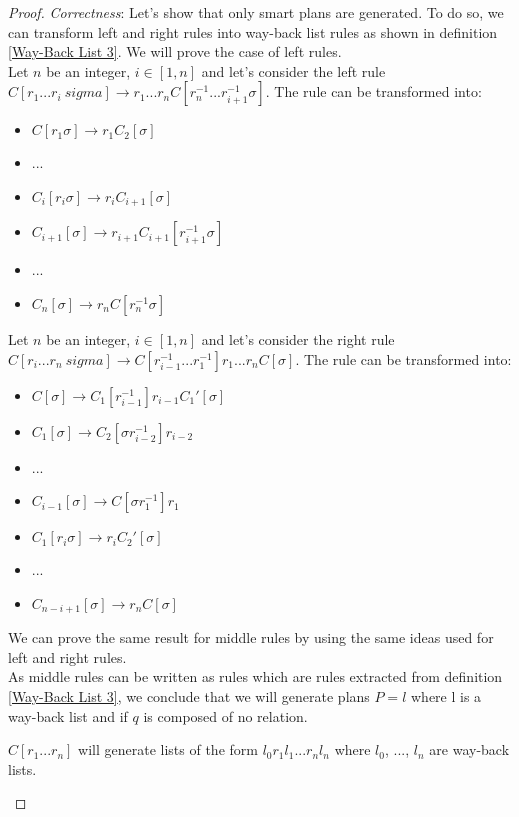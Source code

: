 \documentclass[10pt,a4paper,draft]{article}
\begin{document}
\begin{proof}
\textit{Correctness}: Let's show that only smart plans are generated. To do so, we can transform left and right rules into way-back list rules as shown in definition \ref{Way-Back List 3}. We will prove the case of left rules.\\
Let $n$ be an integer, $i \in [1, n]$ and let's consider the left rule $C[r_1...r_i \ sigma] \rightarrow r_1 ... r_n C[r_n^{-1} ... r_{i+1}^{-1} \sigma]$. The rule can be transformed into:
\begin{itemize}
\item $C[r_1 \sigma] \rightarrow r_1 C_2[\sigma]$
\item ...
\item $C_i[r_i \sigma] \rightarrow r_i C_{i+1}[\sigma]$
\item $C_{i+1}[\sigma] \rightarrow r_{i+1} C_{i+1}[r_{i+1}^{-1} \sigma]$
\item ...
\item $C_n[\sigma] \rightarrow r_n C[r_n^{-1} \sigma]$
\end{itemize}
Let $n$ be an integer, $i \in [1, n]$ and let's consider the right rule $C[r_i...r_n \ sigma] \rightarrow C[r_{i-1}^{-1} ... r_{1}^{-1}] r_1 ... r_n C[\sigma]$. The rule can be transformed into:
\begin{itemize}
\item $C[\sigma] \rightarrow C_1[r_{i-1}^{-1}] r_{i-1} C_1'[\sigma]$
\item $C_1[\sigma] \rightarrow C_2[\sigma r_{i-2}^{-1}] r_{i-2}$
\item ...
\item $C_{i-1}[\sigma] \rightarrow C[\sigma r_1^{-1}] r_1$
\item $C_1[r_i \sigma] \rightarrow r_i C_2'[\sigma]$
\item ...
\item $C_{n - i + 1}[\sigma] \rightarrow r_n C[\sigma]$
\end{itemize}
We can prove the same result for middle rules by using the same ideas used for left and right rules.\\
As middle rules can be written as rules which are rules extracted from definition \ref{Way-Back List 3}, we conclude that we will generate plans $P = l$ where l is a way-back list and if $q$ is composed of no relation.

\begin{Lemma}
\label{formWordsGrammar}
$C[r_1 ... r_n]$ will generate lists of the form $l_0 r_1 l_1 ... r_n l_n$ where $l_0$, ..., $l_n$ are way-back lists.
\end{Lemma}


\end{proof}
\end{document}
